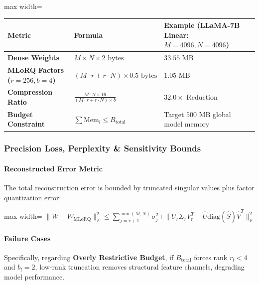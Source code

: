 \begin{center}
\begin{adjustbox}{max width=\columnwidth}
\renewcommand{\arraystretch}{1.2}
\begin{tabular}{lll}
\toprule
Metric & Formula & Example (LLaMA-7B Linear: $M=4096, N=4096$) \\
\midrule
\textbf{Dense Weights} & $M \times N \times 2 \text{ bytes}$ & $33.55 \text{ MB}$ \\
\textbf{MLoRQ Factors ($r=256, b=4$)} & $(M \cdot r + r \cdot N) \times 0.5 \text{ bytes}$ & $1.05 \text{ MB}$ \\
\textbf{Compression Ratio} & $\frac{M \cdot N \times 16}{(M \cdot r + r \cdot N) \times b}$ & $\mathbf{32.0\times}$ Reduction \\
\textbf{Budget Constraint} & $\sum \text{Mem}_l \le B_{\text{total}}$ & Target $500 \text{ MB}$ global model memory \\

\bottomrule
\end{tabular}
\end{adjustbox}
\end{center}

\subsubsection*{Precision Loss, Perplexity \& Sensitivity Bounds}

\paragraph{Reconstructed Error Metric}

The total reconstruction error is bounded by truncated singular values plus factor quantization error:

\begin{center}
\begin{adjustbox}{max width=\columnwidth}
$\displaystyle
\| W - W_{\text{MLoRQ}} \|_F^2 \le \sum_{j=r+1}^{\min(M, N)} \sigma_j^2 + \| U_r \Sigma_r V_r^T - \widehat{U} \text{diag}(\widehat{S}) \widehat{V}^T \|_F^2
$
\end{adjustbox}
\end{center}

\paragraph{Failure Cases}

Specifically, regarding \textbf{Overly Restrictive Budget}, if $B_{\text{total}}$ forces rank $r_l < 4$ and $b_l = 2$, low-rank truncation removes structural feature channels, degrading model performance.



